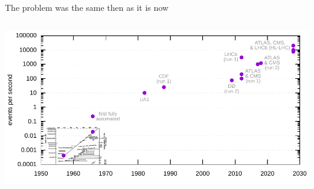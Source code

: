 \documentclass[aspectratio=169]{beamer}
\begin{document}
\begin{frame}{The problem was the same then as it is now}
\vspace{0.25 cm}
\begin{columns}
\includegraphics[width=\linewidth]{PLOTS/event-rates.pdf}
\end{columns}
\end{frame}
\end{document}
